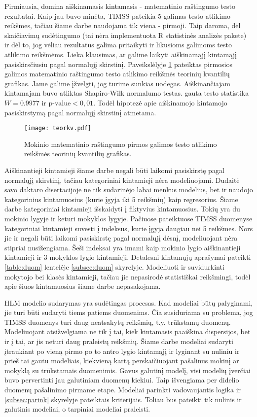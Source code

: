 \documentclass[12pt,a4paper]{article}
\begin{document}
\indent Pirmiausia, domina aiškinamasis kintamasis - matematinio raštingumo testo rezultatai. Kaip jau buvo minėta, TIMSS pateikia 5 galimas testo atlikimo reikšmes, tačiau šiame darbe naudojama tik viena - pirmoji. Taip daroma, dėl skaičiavimų sudėtingumo (tai nėra implementuota R statistinės analizės pakete) ir dėl to, jog vėliau rezultatus galima pritaikyti ir likusioms galimoms testo atlikimo reikšmėms. Lieka klausimas, ar galime laikyti aiškinamąjį kintamąjį pasiskirsčiusiu pagal normalųjį skirstinį. Paveikslėlyje \ref{fig:y} pateiktas pirmosios galimos matematinio raštingumo testo atlikimo reikšmės teorinių kvantilių grafikas. Jame galime įžvelgti, jog turime sunkias uodegas. Aiškinančiajam kintamajam buvo atliktas Shapiro-Wilk normalumo testas. gauta testo statistika $W = 0.9977$ ir $\text{p-value}<0,01$. Todėl hipotezė apie aiškinamojo kintamojo pasiskirstymą pagal normalųjį skirstinį atmetama.

\begin{figure}[H]
\centering
\texttt{[image: teorkv.pdf]}
\caption{Mokinio matematinio raštingumo pirmos galimos testo atlikimo reikšmės teorinių kvantilių grafikas.}
\label{fig:y}
\end{figure}

\indent Aiškinantieji kintamieji šiame darbe negali būti laikomi pasiskirstę pagal normalųjį skirstinį, tačiau kategoriniai kintamieji nėra modeliuojami. Dudaitė savo daktaro disertacijoje \cite{liet2003} ne tik sudarinėjo labai menkus modelius, bet ir naudojo kategorinius kintamuosius (kurie įgyja iki 5 reikšmių) kaip regresorius. Šiame darbe kategoriniai kintamieji išskaidyti į fiktyvius kintamuosius. Tokių yra du mokinio lygyje ir keturi mokyklos lygyje. Pačiuose pateiktuose TIMSS duomenyse kategoriniai kintamieji suvesti į indeksus, kurie įgyja daugiau nei 5 reikšmes. Nors jie ir negali būti laikomi pasiskirstę pagal normalųjį dėsnį, modeliuojant nėra stipriai nusižengiama. Šeši indeksai yra imami kaip mokinio lygio aiškinantieji kintamieji ir 3 mokyklos lygio kintamieji. Detalesni kintamųjų aprašymai pateikti \ref{table:duom} lentelėje \ref{subsec:duom} skyrelyje. Modeliuoti ir suvidurkinti mokytojo bei klasės kintamieji, tačiau jie nepasirodė statistiškai reikšmingi, todėl apie šiuos kintamuosius šiame darbe nepasakojama.

\indent HLM modelio sudarymas yra sudėtingas procesas. Kad modeliai būtų palyginami, jie turi būti sudaryti tiems patiems duomenims. Čia susiduriama su problema, jog TIMSS duomenys turi daug neatsakytų reikšmių, t.y. trūkstamų duomenų. Modeliuojant atsižvelgiama ne tik į tai, kiek kintamasis paaiškina dispersijos, bet ir į tai, ar jis neturi daug praleistų reikšmių. Šiame darbe modeliai sudaryti įtraukiant po vieną pirmo po to antro lygio kintamąjį ir lyginant su nuliniu ir prieš tai gautu modeliais, kiekvieną kartą perskaičiuojant pašalinus mokinį ar mokyklą su trūkstamais duomenimis. Gavus galutinį modelį, visi modelių įverčiai buvo pervertinti jau galutiniam duomenų kiekiui. Taip išvengiama per didelio duomenų pašalinimo pirmame etape. Modeliai parinkti vadovaujantis logika ir \ref{subsec:parink} skyrelyje pateiktais kriterijais. Toliau bus pateikti tik nulinis ir galutinis modeliai, o tarpiniai modeliai praleisti.
\end{document}
